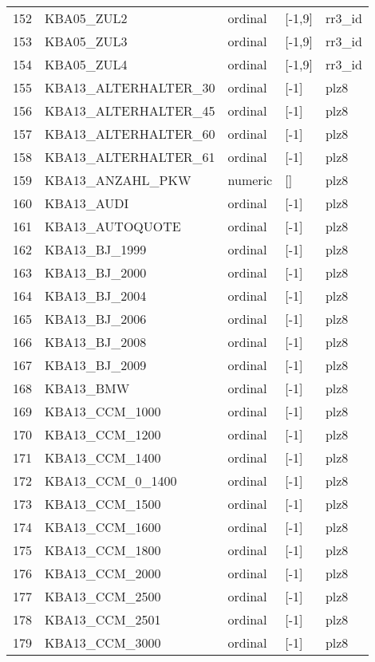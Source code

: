 \begin{longtable}{lllll}
152 &   KBA05\_ZUL2 &  ordinal & [-1,9] &    rr3\_id \\
153 &   KBA05\_ZUL3 &  ordinal & [-1,9] &    rr3\_id \\
154 &   KBA05\_ZUL4 &  ordinal & [-1,9] &    rr3\_id \\
155 & KBA13\_ALTERHALTER\_30 &  ordinal &   [-1] &  plz8 \\
156 & KBA13\_ALTERHALTER\_45 &  ordinal &   [-1] &  plz8 \\
157 & KBA13\_ALTERHALTER\_60 &  ordinal &   [-1] &  plz8 \\
158 & KBA13\_ALTERHALTER\_61 &  ordinal &   [-1] &  plz8 \\
159 & KBA13\_ANZAHL\_PKW &  numeric &     [] &  plz8 \\
160 &   KBA13\_AUDI &  ordinal &   [-1] &  plz8 \\
161 &  KBA13\_AUTOQUOTE &  ordinal &   [-1] &  plz8 \\
162 &    KBA13\_BJ\_1999 &  ordinal &   [-1] &  plz8 \\
163 &    KBA13\_BJ\_2000 &  ordinal &   [-1] &  plz8 \\
164 &    KBA13\_BJ\_2004 &  ordinal &   [-1] &  plz8 \\
165 &    KBA13\_BJ\_2006 &  ordinal &   [-1] &  plz8 \\
166 &    KBA13\_BJ\_2008 &  ordinal &   [-1] &  plz8 \\
167 &    KBA13\_BJ\_2009 &  ordinal &   [-1] &  plz8 \\
168 & KBA13\_BMW &  ordinal &   [-1] &  plz8 \\
169 &   KBA13\_CCM\_1000 &  ordinal &   [-1] &  plz8 \\
170 &   KBA13\_CCM\_1200 &  ordinal &   [-1] &  plz8 \\
171 &   KBA13\_CCM\_1400 &  ordinal &   [-1] &  plz8 \\
172 & KBA13\_CCM\_0\_1400 &  ordinal &   [-1] &  plz8 \\
173 &   KBA13\_CCM\_1500 &  ordinal &   [-1] &  plz8 \\
174 &   KBA13\_CCM\_1600 &  ordinal &   [-1] &  plz8 \\
175 &   KBA13\_CCM\_1800 &  ordinal &   [-1] &  plz8 \\
176 &   KBA13\_CCM\_2000 &  ordinal &   [-1] &  plz8 \\
177 &   KBA13\_CCM\_2500 &  ordinal &   [-1] &  plz8 \\
178 &   KBA13\_CCM\_2501 &  ordinal &   [-1] &  plz8 \\
179 &   KBA13\_CCM\_3000 &  ordinal &   [-1] &  plz8 \\

\end{longtable}
